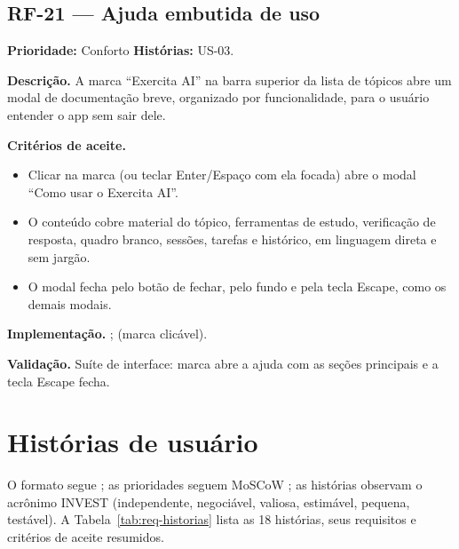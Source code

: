 \subsection{RF-21 --- Ajuda embutida de uso}

\textbf{Prioridade:} Conforto \quad \textbf{Histórias:} US-03.

\textbf{Descrição.} A marca ``Exercita AI'' na barra superior da lista de tópicos abre um modal de documentação breve, organizado por funcionalidade, para o usuário entender o app sem sair dele.

\textbf{Critérios de aceite.}
\begin{itemize}
    \item Clicar na marca (ou teclar Enter/Espaço com ela focada) abre o modal ``Como usar o Exercita AI''.
    \item O conteúdo cobre material do tópico, ferramentas de estudo, verificação de resposta, quadro branco, sessões, tarefas e histórico, em linguagem direta e sem jargão.
    \item O modal fecha pelo botão de fechar, pelo fundo e pela tecla Escape, como os demais modais.
\end{itemize}

\textbf{Implementação.} ;  (marca clicável).

\textbf{Validação.} Suíte de interface: marca abre a ajuda com as seções principais e a tecla Escape fecha.

\section{Histórias de usuário}
\label{ap:req-historias}

O formato segue \cite{cohn_2004}; as prioridades seguem MoSCoW \cite{wiegers_beatty_2013}; as histórias observam o acrônimo INVEST (independente, negociável, valiosa, estimável, pequena, testável). A Tabela~\ref{tab:req-historias} lista as 18 histórias, seus requisitos e critérios de aceite resumidos.

